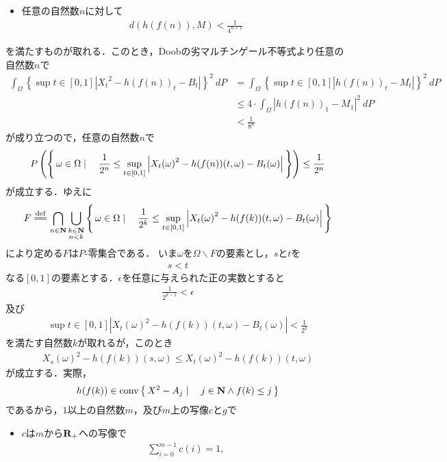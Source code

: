 \begin{sketch}
\begin{description}
\begin{itemize}
					\item 任意の自然数$n$に対して
						\begin{align}
							d(h(f(n)),M) < \frac{1}{4^{n+1}}
						\end{align}
				\end{itemize}
				を満たすものが取れる．このとき，Doobの劣マルチンゲール不等式より任意の自然数$n$で
				\begin{align}
					\int_\Omega \left\{\sup{t \in [0,1]}{\left|{X_{t}}^{2} - h(f(n))_{t} - B_{t}\right|}\right\}^{2}\ dP
					&= \int_\Omega \left\{\sup{t \in [0,1]}{\left|h(f(n))_{t} - M_{t}\right|}\right\}^{2}\ dP \\
					&\leq 4 \cdot \int_\Omega \left|h(f(n))_{1} - M_{1}\right|^{2}\ dP \\
					&< \frac{1}{8^{n}}
				\end{align}
				が成り立つので，任意の自然数$n$で
				\begin{align}
					P\left(\left\{\, \omega \in \Omega \mid \quad 
					\frac{1}{2^{n}} \leq \operatorname*{sup}_{t \in [0,1]} \left|{X_{t}(\omega)}^{2} - h(f(n))(t,\omega) - B_{t}(\omega) \right|\, \right\}\right)
					\leq \frac{1}{2^{n}}
				\end{align}
				が成立する．ゆえに
				\begin{align}
					F \defeq \bigcap_{n \in \Natural} \bigcup_{\substack{k \in \Natural \\ n < k}} 
					\Set{\omega \in \Omega}{\frac{1}{2^{k}} \leq \sup{t \in [0,1]}{\left|{X_{t}(\omega)}^{2} - h(f(k))(t,\omega) - B_{t}(\omega) \right|}}
				\end{align}
				により定める$F$は$P$-零集合である．
				いま$\omega$を$\Omega \backslash F$の要素とし，$s$と$t$を
				\begin{align}
					s < t
				\end{align}
				なる$[0,1]$の要素とする．$\epsilon$を任意に与えられた正の実数とすると
				\begin{align}
					\frac{1}{2^{k-1}} < \epsilon
				\end{align}
				及び
				\begin{align}
					\sup{t \in [0,1]}{\left|{X_{t}(\omega)}^{2} - h(f(k))(t,\omega) - B_{t}(\omega)\right|} < \frac{1}{2^{k}}
				\end{align}
				を満たす自然数$k$が取れるが，このとき
				\begin{align}
					{X_{s}(\omega)}^{2} - h(f(k))(s,\omega)
					\leq {X_{t}(\omega)}^{2} - h(f(k))(t,\omega)
					\label{fom:thm_decomposition_of_local_martingales_1}
				\end{align}
				が成立する．実際，
				\begin{align}
					h(f(k)) \in \operatorname*{conv} \left\{\, X^{2} - A_{j} \mid \quad j \in \mathbf{N} \wedge f(k) \leq j\, \right\}
				\end{align}
				であるから，$1$以上の自然数$m$，及び$m$上の写像$c$と$g$で
				\begin{itemize}
					\item $c$は$m$から$\mathbf{R}_{+}$への写像で
						\begin{align}
							\sum_{i=0}^{m-1} c(i) = 1,
						\end{align}
						

\end{itemize}
\end{description}
\end{sketch}
